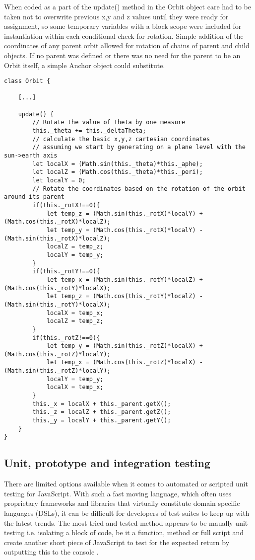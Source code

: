 \documentclass[twoside]{bhamthesis}
\begin{document}
When coded as a part of the update() method in the Orbit object care had to be taken not to overwrite previous x,y and z values until they were ready for assignment, so some temporary variables with a block scope were included for instantiation within each conditional check for rotation. Simple addition of the coordinates of any parent orbit allowed for rotation of chains of parent and child objects. If no parent was defined or there was no need for the parent to be an Orbit itself, a simple Anchor object could substitute.

\newpage

\begin{lstlisting}[label=Implemented code for rotation in 3D space, caption=Implemented code for rotation in 3D space on an update() call, captionpos=b]
class Orbit {

	[...]
	
	update() {
		// Rotate the value of theta by one measure
		this._theta += this._deltaTheta;
		// calculate the basic x,y,z cartesian coordinates
		// assuming we start by generating on a plane level with the sun->earth axis
		let localX = (Math.sin(this._theta)*this._aphe);
		let localZ = (Math.cos(this._theta)*this._peri);
		let localY = 0;
		// Rotate the coordinates based on the rotation of the orbit around its parent
		if(this._rotX!==0){
			let temp_z = (Math.sin(this._rotX)*localY) + (Math.cos(this._rotX)*localZ);
			let temp_y = (Math.cos(this._rotX)*localY) - (Math.sin(this._rotX)*localZ);
			localZ = temp_z;
			localY = temp_y;
		}
		if(this._rotY!==0){
			let temp_x = (Math.sin(this._rotY)*localZ) + (Math.cos(this._rotY)*localX);
			let temp_z = (Math.cos(this._rotY)*localZ) - (Math.sin(this._rotY)*localX);
			localX = temp_x;
			localZ = temp_z;
		}
		if(this._rotZ!==0){
			let temp_y = (Math.sin(this._rotZ)*localX) + (Math.cos(this._rotZ)*localY);
			let temp_x = (Math.cos(this._rotZ)*localX) - (Math.sin(this._rotZ)*localY);
			localY = temp_y;
			localX = temp_x;
		}
		this._x = localX + this._parent.getX();
		this._z = localZ + this._parent.getZ();
		this._y = localY + this._parent.getY();
	}
}
\end{lstlisting}

\newpage


\subsection{Unit, prototype and integration testing}

There are limited options available when it comes to automated or scripted unit testing for JavaScript. With such a fast moving language, which often uses proprietary frameworks and libraries that virtually constitute domain specific languages (DSLs), it can be difficult for developers of test suites to keep up with the latest trends.
The most tried and tested method appears to be maually unit testing i.e. isolating a block of code, be it a function, method or full script and create another short piece of JavaScript to test for the expected return by outputting this to the console \cite{zaefferer_introduction_2012}.
\end{document}
